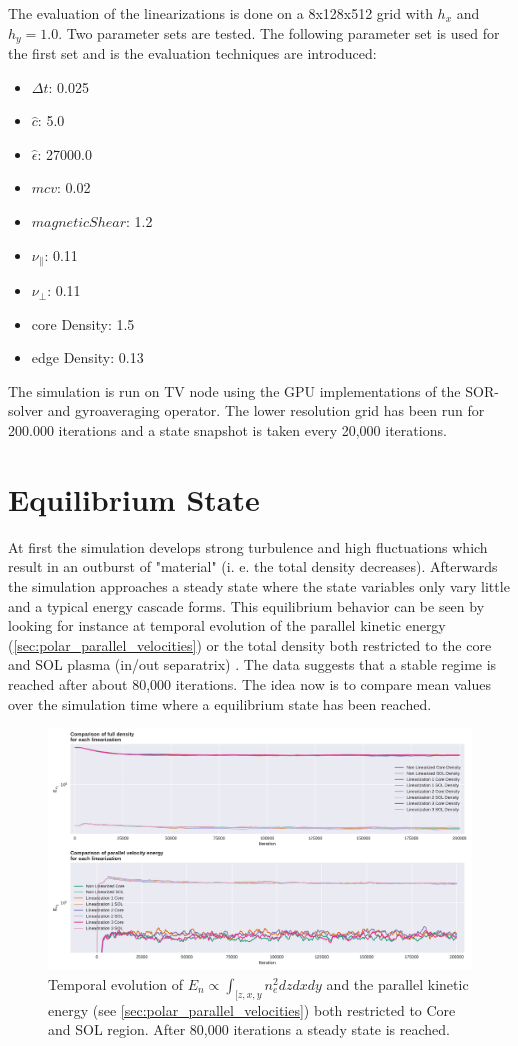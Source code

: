 \documentclass[master.tex]{subfiles}
\begin{document}
The evaluation of the linearizations is done on a 8x128x512 grid with $h_x$ and $h_y=1.0$. Two parameter sets are tested. The following parameter set is used for the first set and is the evaluation techniques are introduced:
\begin{itemize}
    \item $\Delta t$: 0.025
    \item $\hat{c}$: 5.0
    \item $\hat{\epsilon}$: 27000.0
    \item $mcv$: 0.02
    \item $magnetic Shear$: 1.2
    \item $\nu_{\parallel}$: 0.11
    \item $\nu_{\perp}$: 0.11
    \item core Density: 1.5
    \item edge Density: 0.13
\end{itemize}
The simulation is run on \ac{TV} node using the GPU implementations of the \ac{SOR}-solver and gyroaveraging operator. The lower resolution grid has been run for 200.000 iterations and a state snapshot is taken every 20,000 iterations.

\section{Equilibrium State}
At first the simulation develops strong turbulence and high fluctuations which result in an outburst of "material" (i. e. the total density decreases). Afterwards the simulation approaches a steady state where the state variables only vary little and a typical energy cascade forms. This equilibrium behavior can be seen by looking for instance at temporal evolution of the parallel kinetic energy (\autoref{sec:polar_parallel_velocities}) or the total density both restricted to the core and \ac{SOL} plasma (in/out separatrix) . The data suggests that a stable regime is reached after about 80,000 iterations. The idea now is to compare mean values over the simulation time where a equilibrium state has been reached. 

\begin{figure}[!hbtp]
    \includegraphics[width=\linewidth]{pdfs/equilibrium_state_low.pdf}
    \caption{Temporal evolution of $E_n\propto \int_{[z,x,y} n_e^2 dzdxdy$ and the parallel kinetic energy (see \autoref{sec:polar_parallel_velocities}) both restricted to Core and \ac{SOL} region. After 80,000 iterations a steady state is reached.}
\end{figure}
\end{document}
